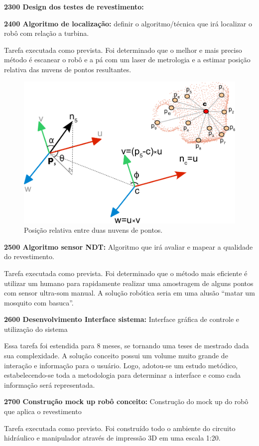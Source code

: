 \textbf{2300 Design dos testes de revestimento:} %

\textbf{2400 Algoritmo de localização:} definir o algoritmo/técnica que irá
localizar o robô com relação a turbina.

Tarefa executada como prevista. Foi determinado que o melhor e mais preciso
método é escanear o robô e a pá com um laser de metrologia e a estimar posição
relativa das nuvens de pontos resultantes.

\begin{figure}[H]
\includegraphics[width=0.6\columnwidth]{figs/pc_position}
\caption{Posição relativa entre duas nuvens de pontos.}
\end{figure} 

\textbf{2500 Algoritmo sensor NDT:} Algoritmo que irá avaliar e mapear a
qualidade do revestimento.

Tarefa executada como prevista. Foi determinado que o método mais eficiente é
utilizar um humano para rapidamente realizar uma amostragem de alguns pontos com
sensor ultra-som manual. A solução robótica seria em uma alusão “matar um mosquito com basuca”.

\textbf{2600 Desenvolvimento Interface sistema:} Interface gráfica de controle e
utilização do sistema

Essa tarefa foi estendida para 8 meses, se tornando uma teses de mestrado dada
sua complexidade. A solução conceito possui um volume muito grande de interação
e informação para o usuário. Logo, adotou-se um estudo metódico,
estabelecendo-se toda a metodologia para determinar a interface e como cada
informação será representada.

\textbf{2700 Construção mock up robô conceito:} Construção do mock up do robô
que aplica o revestimento

Tarefa executada como previsto. Foi construído todo o ambiente do circuito
hidráulico e manipulador através de impressão 3D em uma escala 1:20.

